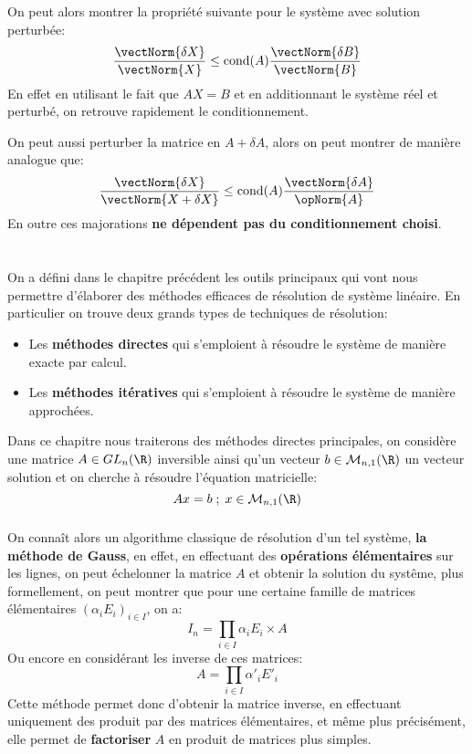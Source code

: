 \subsection*{}
On peut alors montrer la propriété suivante pour le système avec solution perturbée:
\[
   \frac{\vectNorm{\delta X}}{\vectNorm{X}} \leq  \text{cond}(A)\frac{\vectNorm{\delta B}}{\vectNorm{B}}
\]
En effet en utilisant le fait que \(AX = B\) et en additionnant le système réel et perturbé, on retrouve rapidement le conditionnement.\<

On peut aussi perturber la matrice en \(A + \delta A\), alors on peut montrer de manière analogue que:
\[
   \frac{\vectNorm{\delta X}}{\vectNorm{X +\delta X}} \leq  \text{cond}(A)\frac{\vectNorm{\delta A}}{\opNorm{A}}
\]
En outre ces majorations \textbf{ne dépendent pas du conditionnement choisi}.
\chapter*{}
On a défini dans le chapitre précédent les outils principaux qui vont nous permettre d'élaborer des méthodes efficaces de résolution de système linéaire. En particulier on trouve deux grands types de techniques de résolution:
\begin{itemize}
   \item Les \textbf{méthodes directes} qui s'emploient à résoudre le système de manière exacte par calcul.
   \item Les \textbf{méthodes itératives} qui s'emploient à résoudre le système de manière approchées.
\end{itemize}
Dans ce chapitre nous traiterons des méthodes directes principales, on considère une matrice \( A \in GL_n( \R) \) inversible ainsi qu'un vecteur \( b \in \mathcal{M}_{n, 1}( \R) \) un vecteur solution et on cherche à résoudre l'équation matricielle:
\[ 
   Ax = b \; ; \; x \in \mathcal{M}_{n, 1}( \R)
\]
\subsection*{}
On connaît alors un algorithme classique de résolution d'un tel système, \textbf{la méthode de Gauss}, en effet, en effectuant des \textbf{opérations élémentaires} sur les lignes, on peut échelonner la matrice \( A \) et obtenir la solution du systême, plus formellement, on peut montrer que pour une certaine famille de matrices élémentaires \( (\alpha_i E_{i})_{i \in I} \), on a:
\[ 
   I_n = \prod_{i \in I} \alpha_i E_{i} \times A
\]
Ou encore en considérant les inverse de ces matrices:
\[ 
   A = \prod_{i \in I} \alpha'_i E'_{i}
\]
Cette méthode permet donc d'obtenir la matrice inverse, en effectuant uniquement des produit par des matrices élémentaires, et même plus précisément, elle permet de \textbf{factoriser} \( A \) en produit de matrices plus simples.
